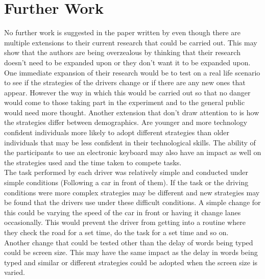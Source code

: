 \documentclass[12pt]{article}
\begin{document}
\section{Further Work}
No further work is suggested in the paper written by \cite{Lee} even though there are multiple extensions to their current research that could be carried out. This may show that the authors are being overzealous by thinking that their research doesn't need to be expanded upon or they don't want it to be expanded upon. \\
One immediate expansion of their research would be to test on a real life scenario to see if the strategies of the drivers change or if there are any new ones that appear. However the way in which this would be carried out so that no danger would come to those taking part in the experiment and to the general public would need more thought. Another extension that \cite{Lee} don't draw attention to is how the strategies differ between demographics. Are younger and more technology confident individuals more likely to adopt different strategies than older individuals that may be less confident in their technological skills. The ability of the participants to use an electronic keyboard may also have an impact as well on the strategies used and the time taken to compete tasks. \\
The task performed by each driver was relatively simple and conducted under simple conditions (Following a car in front of them). If the task or the driving conditions were more complex strategies may be different and new strategies may be found that the drivers use under these difficult conditions. A simple change for this could be varying the speed of the car in front or having it change lanes occasionally. This would prevent the driver from getting into a routine where they check the road for a set time, do the task for a set time and so on. \\
Another change that could be tested other than the delay of words being typed could be screen size. This may have the same impact as the delay in words being typed and similar or different strategies could be adopted when the screen size is varied.


\end{document}
